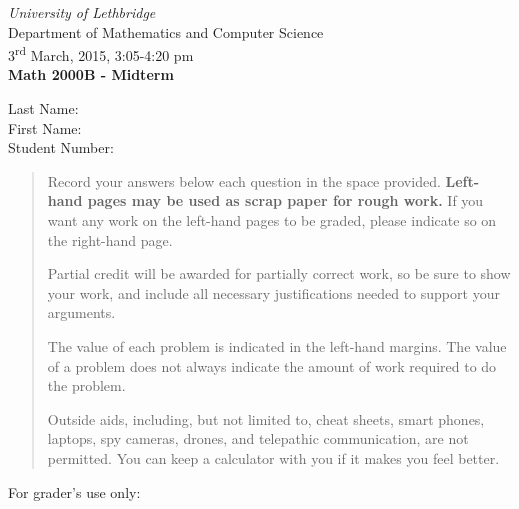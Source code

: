 \documentclass[12pt]{article}
\newcommand{\skipline}{\vspace{12pt}}
\begin{document}
\author{Instructor: Sean Fitzpatrick}
\thispagestyle{plain}
\begin{center}
\emph{University of Lethbridge}\\
Department of Mathematics and Computer Science\\
3\textsuperscript{rd} March, 2015, 3:05-4:20 pm\\
{\bf Math 2000B - Midterm}\\
\end{center}
\skipline \skipline \skipline \noindent \skipline
Last Name:\underline{\hspace{350pt}}\\
\skipline
First Name:\underline{\hspace{348pt}}\\
\skipline
Student Number:\underline{\hspace{322pt}}\\


\vspace{0.5in}


\begin{quote}
 Record your answers below each question in the space provided.    {\bf Left-hand pages may be used as scrap paper for rough work.}  If you want any work on the left-hand pages to be graded, please indicate so on the right-hand page.
 
 \bigskip
 
Partial credit will be awarded for partially correct work, so be sure to show your work, and include all necessary justifications needed to support your arguments. 

The value of each problem is indicated in the left-hand margins. The value of a problem does not always indicate the amount of work required to do the problem.

Outside aids, including, but not limited to, cheat sheets, smart phones, laptops, spy cameras, drones, and telepathic communication, are not permitted. You can keep a calculator with you if it makes you feel better.
\end{quote}


\vspace{0.5in}

For grader's use only:
\end{document}

